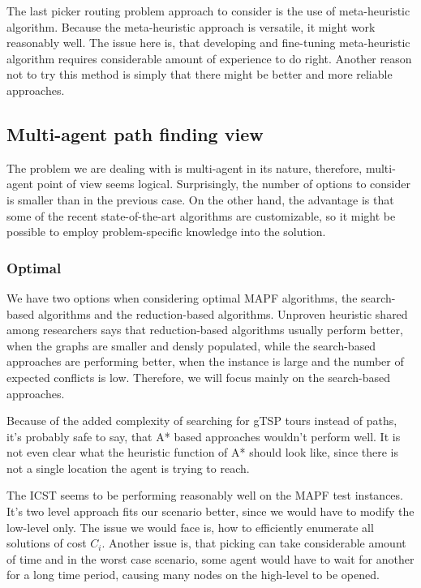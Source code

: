 The last picker routing problem approach to consider is the use of meta-heuristic algorithm. Because the meta-heuristic approach is versatile, it might work reasonably well. The issue here is, that developing and fine-tuning meta-heuristic algorithm requires considerable amount of experience to do right. Another reason not to try this method is simply that there might be better and more reliable approaches.


\subsection{Multi-agent path finding view}

The problem we are dealing with is multi-agent in its nature, therefore, multi-agent point of view seems logical. Surprisingly, the number of options to consider is smaller than in the previous case. On the other hand, the advantage is that some of the recent state-of-the-art algorithms are customizable, so it might be possible to employ problem-specific knowledge into the solution.

\subsubsection{Optimal}
We have two options when considering optimal MAPF algorithms, the search-based algorithms and the reduction-based algorithms. Unproven heuristic shared among researchers says that reduction-based algorithms usually perform better, when the graphs are smaller and densly populated, while the search-based approaches are performing better, when the instance is large and the number of expected conflicts is low. Therefore, we will focus mainly on the search-based approaches.
\par

Because of the added complexity of searching for gTSP tours instead of paths, it's probably safe to say, that A* based approaches wouldn't perform well. It is not even clear what the heuristic function of A* should look like, since there is not a single location the agent is trying to reach.
\par
The ICST seems to be performing reasonably well on the MAPF test instances. It's two level approach fits our scenario better, since we would have to modify the low-level only. The issue we would face is, how to efficiently enumerate all solutions of cost $C_i$. Another issue is, that picking can take considerable amount of time and in the worst case scenario, some agent would have to wait for another for a long time period, causing many nodes on the high-level to be opened.
\par


